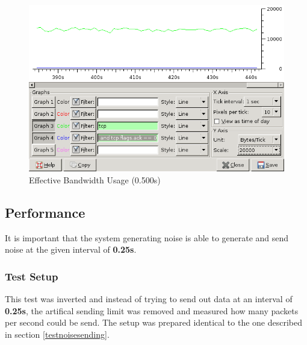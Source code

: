 \begin{figure}[htbp]
\caption{Effective Bandwidth Usage (0.500s)}
\label{bw0500}
\centering
\includegraphics[scale=0.5]{bandwidth-0500.png}
\end{figure}
\subsection{Performance}
It is important that the system generating noise is able to generate 
and send noise at the given interval of \textbf{0.25s}.
\subsubsection{Test Setup}
This test was inverted and instead of trying to send out data
at an interval of \textbf{0.25s}, the artifical sending limit was removed
and measured how many packets per second could be send.
The setup was prepared identical to the one described
in section \ref{testnoisesending}. 

